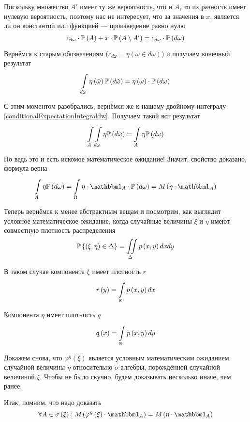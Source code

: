 \begin{enumerate}[label=\bfseries Формулировка \arabic*:]
        Поскольку множество $A'$ имеет ту же вероятность, что и $A$,
        то их разность имеет нулевую вероятность,
        поэтому нас не интересует, что за значения в $x$,
        является ли он константой или функцией --- произведение равно нулю
        $$c_{d\omega} \cdot \probability{A}
            + x \cdot \probability{A \setminus A'}
            = c_{d\omega} \cdot \probability{d\omega}$$

        Вернёмся к старым обозначениям
        ($c_{d\omega} = \eta\left( \omega \in d\omega \right)$)
        и получаем конечный результат
        $$\integralc{d\omega}{}{\probability{d\tilde{\omega}}}{
            \eta\left( \tilde{\omega}\right)}
            = \eta\left( \omega \right) \cdot \probability{d\omega}$$
\end{enumerate}

С этим моментом разобрались, вернёмся же к нашему двойному интегралу
\eqref{conditionalExpectationIntegraldw}.
Получаем такой вот результат
$$\int\limits_A \integralc{d\omega}{}{\probability{d\tilde{\omega}}}{\eta}
    = \integralc{A}{}{\probability{d\omega}}{\eta}$$

Но ведь это и есть искомое математическое ожидание!
Значит, свойство доказано, формула верна
$$\integralc{A}{}{\probability{d\omega}}{\eta}
    = \integralc{\Omega}{}{\probability{d\omega}}{
        \eta \cdot \indicatorof{A} \cdot}
    = \mean{\left( \eta \cdot \indicatorof{A} \right)}$$

Теперь вернёмся к менее абстрактным вещам и посмотрим,
как выглядит условное математическое ожидание,
когда случайные величины $\xi$ и $\eta$ имеют совместную плотность распределения
$$\Probability{\left( \xi, \eta \right) \in \Delta}
    = \iint\limits_\Delta\pdf{x,y}dxdy$$

В таком случае компонента $\xi$ имеет плотность $r$
$$r\left( y \right) = \integral{\mathbb{R}}{}{x}{\pdf{x,y}}$$

Компонента $\eta$ имеет плотность $q$
$$q\left( x \right) = \integral{\mathbb{R}}{}{y}{\pdf{x,y}}$$

Докажем снова, что $\varphi^\eta\left( \xi \right)$ является
условным математическим ожиданием случайной величины $\eta$
относительно $\sigma$-алгебры, порождённой случайной величиной $\xi$.
Чтобы не было скучно, будем доказывать несколько иначе, чем ранее.

Итак, помним, что надо доказать
\begin{equation}\label{conditionalExpectationContinualStart}
    \forall A \in \sigma\left( \xi \right):
        \mean{\left( \varphi^{\eta}\left( \xi \right)
            \cdot \indicatorof{A} \right)}
            = \mean{\left( \eta \cdot \indicatorof{A} \right)}
\end{equation}

